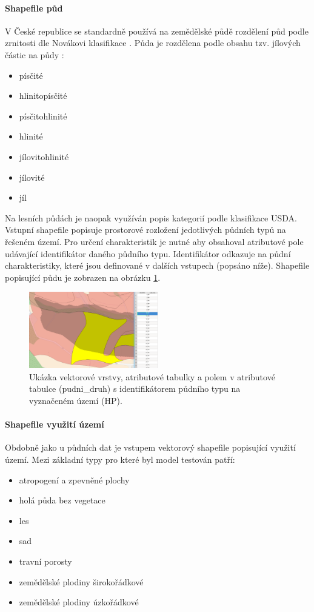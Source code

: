 \paragraph{Shapefile půd} \label{sec:vstuppuda}


V České republice se standardně používá na zemědělské půdě rozdělení půd podle zrnitosti dle Novákovi klasifikace . Půda je rozdělena podle obsahu tzv. jílových částic na půdy \cite{kavka}:
\begin{itemize} \itemsep 0pt
  \item písčité
  \item hlinitopísčité
  \item písčitohlinité
  \item hlinité
  \item jílovitohlinité
  \item jílovité
  \item jíl
\end{itemize}

Na lesních půdách je naopak využíván popis kategorií podle klasifikace USDA.
Vstupní shapefile popisuje prostorové rozložení jedotlivých půdních typů na řešeném území. Pro určení charakteristik je nutné aby obsahoval atributové pole udávající identifikátor daného půdního typu. Identifikátor odkazuje na půdní charakteristiky, které jsou definované v dalších vstupech (popsáno níže). Shapefile popisující půdu je zobrazen na obrázku \ref{fig:bykovicepuda}.
\begin{figure}
  \centering
  \includegraphics[width=0.5\textwidth]{./img/pudnityp.png}
  \caption{Ukázka vektorové vrstvy, atributové tabulky a polem v atributové tabulce (pudni\_druh) s identifikátorem půdního typu na vyznačeném území (HP).}
  \label{fig:bykovicepuda}
\end{figure}



\paragraph{Shapefile využití území} \label{sec:vstupvegetace}

Obdobně jako u půdních dat je vstupem vektorový shapefile popisující využití území. Mezi základní typy pro které byl model testován patří:
\begin{itemize} \itemsep 0pt
  \item atropogení a zpevněné plochy  
  \item holá půda bez vegetace
  \item les
  \item sad
  \item travní porosty
  \item zemědělské plodiny širokořádkové
  \item zemědělské plodiny úzkořádkové
\end{itemize}

